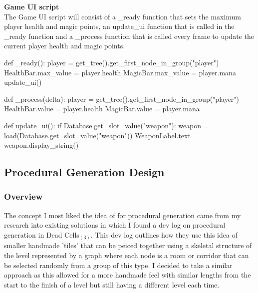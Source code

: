 \documentclass{article}
\begin{document}
        \textbf{Game UI script}\\
        The Game UI script will consist of a \_ready function that sets the maximum player health and magic points, an update\_ui function that is called in the \_ready function and a \_process function that is called every frame to update the current player health and magic points.\\
        \begin{python}
def _ready():
   player = get_tree().get_first_node_in_group("player")
   HealthBar.max_value = player.health
   MagicBar.max_value = player.mana
   update_ui()
                
def _process(delta):
   player = get_tree().get_first_node_in_group("player")
   HealthBar.value = player.health
   MagicBar.value = player.mana
        
def update_ui():
   if Database.get_slot_value("weapon"):
      weapon = load(Database.get_slot_value("weapon"))
      WeaponLabel.text = weapon.display_string()
        \end{python}

        \subsection{Procedural Generation Design}
        \subsubsection{Overview}
        The concept I most liked the idea of for procedural generation came from my research into existing solutions in which I found a dev log on procedural generation in Dead Cells$_{(3)}$. This dev log outlines how they use this idea of smaller handmade 'tiles' that can be peiced together using a skeletal structure of the level represented by a graph where each node is a room or corridor that can be selected randomly from a group of this type. I decided to take a similar approach as this allowed for a more handmade feel with similar lengths from the start to the finish of a level but still having a different level each time.\\
\end{document}
